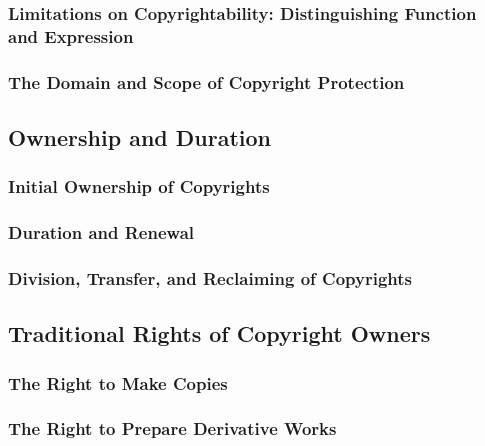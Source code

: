 
\subsubsection{Limitations on Copyrightability: Distinguishing Function and 
Expression}


\subsubsection{The Domain and Scope of Copyright Protection}


\subsection{Ownership and Duration}


\subsubsection{Initial Ownership of Copyrights}


\subsubsection{Duration and Renewal}


\subsubsection{Division, Transfer, and Reclaiming of Copyrights}


\subsection{Traditional Rights of Copyright Owners}


\subsubsection{The Right to Make Copies}


\subsubsection{The Right to Prepare Derivative Works}

